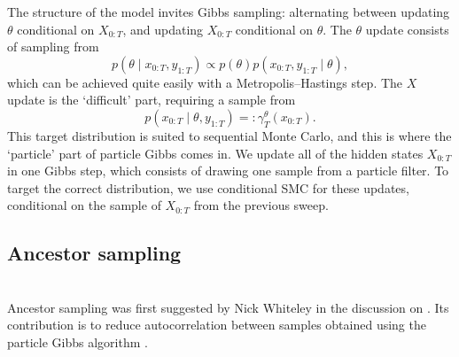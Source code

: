 The structure of the model invites Gibbs sampling: alternating between updating $\theta$ conditional on $X_{0:T}$, and updating $X_{0:T}$ conditional on $\theta$.
The $\theta$ update consists of sampling from 
\begin{equation*}
p(\theta \mid x_{0:T}, y_{1:T}) \propto p(\theta) p(x_{0:T}, y_{1:T} \mid \theta) ,
\end{equation*}
which can be achieved quite easily with a Metropolis--Hastings step.
The $X$ update is the `difficult' part, requiring a sample from
\begin{equation*}
p(x_{0:T} \mid \theta , y_{1:T}) =: \gamma_T^\theta(x_{0:T}) .
\end{equation*}
This target distribution is suited to sequential Monte Carlo, and this is where the `particle' part of particle Gibbs comes in.
We update all of the hidden states $X_{0:T}$ in one Gibbs step, which consists of drawing one sample from a particle filter. To target the correct distribution, we use conditional SMC for these updates, conditional on the sample of $X_{0:T}$ from the previous sweep. 




\subsection{Ancestor sampling \seb{$\sim$} } \label{sec:ancsamp}
\\

Ancestor sampling was first suggested by Nick Whiteley in the discussion on \textcite{andrieu2010}. Its contribution is to reduce autocorrelation between samples obtained using the particle Gibbs algorithm \parencite{andrieu2010}.

